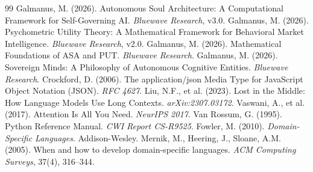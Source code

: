 \documentclass[12pt,a4paper]{article}
\theoremstyle{plain}
\theoremstyle{definition}
\theoremstyle{remark}
\begin{document}
\begin{thebibliography}{99}
 Galmanus, M. (2026). Autonomous Soul Architecture: A Computational Framework for Self-Governing AI. \textit{Bluewave Research}, v3.0.
 Galmanus, M. (2026). Psychometric Utility Theory: A Mathematical Framework for Behavioral Market Intelligence. \textit{Bluewave Research}, v2.0.
 Galmanus, M. (2026). Mathematical Foundations of ASA and PUT. \textit{Bluewave Research}.
 Galmanus, M. (2026). Sovereign Minds: A Philosophy of Autonomous Cognitive Entities. \textit{Bluewave Research}.
 Crockford, D. (2006). The application/json Media Type for JavaScript Object Notation (JSON). \textit{RFC 4627}.
 Liu, N.F., et al. (2023). Lost in the Middle: How Language Models Use Long Contexts. \textit{arXiv:2307.03172}.
 Vaswani, A., et al. (2017). Attention Is All You Need. \textit{NeurIPS 2017}.
 Van Rossum, G. (1995). Python Reference Manual. \textit{CWI Report CS-R9525}.
 Fowler, M. (2010). \textit{Domain-Specific Languages}. Addison-Wesley.
 Mernik, M., Heering, J., Sloane, A.M. (2005). When and how to develop domain-specific languages. \textit{ACM Computing Surveys}, 37(4), 316--344.
\end{thebibliography}
\end{document}
